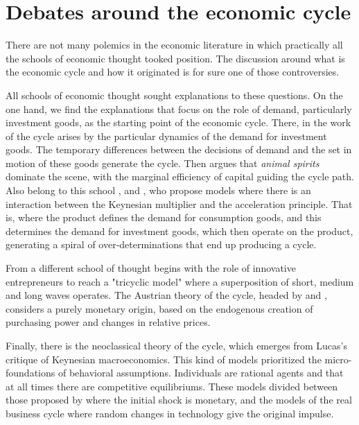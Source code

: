 \documentclass[a4paper]{article}
\begin{document}
	
	\section{Debates around the economic cycle}
	
	There are not many polemics in the economic literature in which practically all the schools of economic thought tooked position. The discussion around what is the economic cycle and how it originated is for sure one of those controversies.
	
	All schools of economic thought sought explanations to these questions. On the one hand, we find the explanations that focus on the role of demand, particularly investment goods, as the starting point of the economic cycle. There, in the work of \cite{kalecki2013essays} the cycle arises by the particular dynamics of the demand for investment goods. The temporary differences between the decisions of demand and the set in motion of these goods generate the cycle. Then \cite{keynes2018general} argues that \textit{animal spirits} dominate the scene, with the marginal efficiency of capital guiding the cycle path. Also belong to this school \cite {harrod1936trade}, \cite{kaldor1940model} and \cite{samuelson1939synthesis}, who propose models where there is an interaction between the Keynesian multiplier and the acceleration principle. That is, where the product defines the demand for consumption goods, and this determines the demand for investment goods, which then operate on the product, generating a spiral of over-determinations that end up producing a cycle.
	
	From a different school of thought \cite{schumpeter1939business} begins with the role of innovative entrepreneurs to reach a "tricyclic model" where a superposition of short, medium and long waves operates.
	The Austrian theory of the cycle, headed by \cite{hayek1933} and \cite{von1943elastic}, considers a purely monetary origin, based on the endogenous creation of purchasing power and changes in relative prices.
	
	Finally, there is the neoclassical theory of the cycle, which emerges from Lucas's critique of Keynesian macroeconomics. This kind of models prioritized the micro-foundations of behavioral assumptions. Individuals are rational agents and that at all times there are competitive equilibriums. These models divided between those proposed by \cite{lucas1975equilibrium} where the initial shock is monetary, and the models of the real business cycle \citep{plosser1989understanding} where random changes in technology give the original impulse.
	
\end{document}
